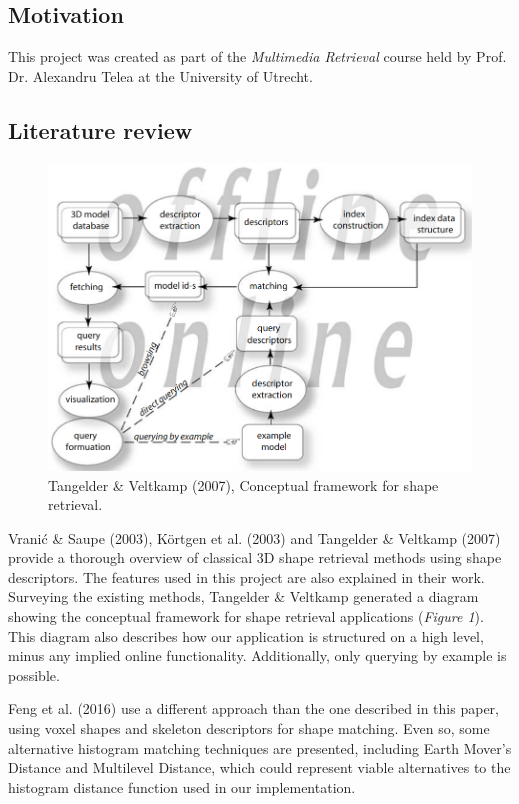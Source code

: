 \documentclass{bigdata}
\begin{document}
\subsection{Motivation}
This project was created as part of the \textit{Multimedia Retrieval} course held by Prof. Dr. Alexandru Telea at the University of Utrecht.

\subsection{Literature review}

\begin{figure}[!b]
	\centering
	\includegraphics[width=0.7\linewidth]{Pictures/conceptualdiagram.png}
	\caption{Tangelder \& Veltkamp (2007), Conceptual framework for shape retrieval.}
\end{figure}

Vranić \& Saupe (2003), Körtgen et al. (2003) and Tangelder \& Veltkamp (2007) provide a thorough overview of classical 3D shape retrieval methods using shape descriptors. The features used in this project are also explained in their work. Surveying the existing methods, Tangelder \& Veltkamp generated a diagram showing the conceptual framework for shape retrieval applications (\textit{Figure 1}). This diagram also describes how our application is structured on a high level, minus any implied online functionality. Additionally, only querying by example is possible.
 
\noindent Feng et al. (2016) use a different approach than the one described in this paper, using voxel shapes and skeleton descriptors for shape matching. Even so, some alternative histogram matching techniques are presented, including Earth Mover's Distance and Multilevel Distance, which could represent viable alternatives to the histogram distance function used in our implementation.
\end{document}
